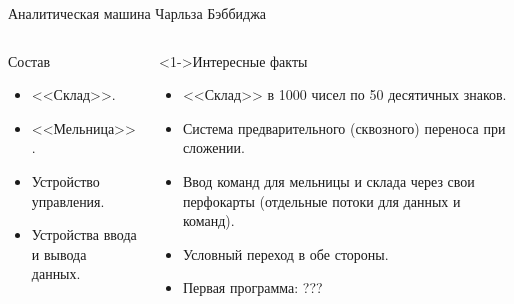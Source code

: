 \documentclass[pdf,9pt,aspectratio=169]{beamer}
\begin{document}
\begin{frame}{Аналитическая машина Чарльза Бэббиджа}
\begin{columns}[T]
\begin{column}[]{0.45\textwidth}
\begin{exampleblock}
\begin{center}
        \end{center}
      \end{exampleblock}
      \begin{block}{Состав}
        \begin{itemize}
          \item {<<Склад>>}.
          \item {<<Мельница>>}.
          \item Устройство управления.
          \item Устройства ввода и вывода данных.
        \end{itemize}
      \end{block}
    \end{column}
    \begin{column}[]{0.45\textwidth}  
      \begin{block}<1->{Интересные факты}
        \begin{itemize}
          \item {<<Склад>>} в 1000 чисел по 50 десятичных знаков.
          \item Система предварительного (сквозного) переноса при сложении.
          \item Ввод команд для мельницы и склада через  свои перфокарты (отдельные потоки для данных и команд).
          \item Условный переход в обе стороны.
          \item Первая программа: ???
        \end{itemize}
      \end{block}
    \end{column}
  \end{columns}
\end{frame}
\end{document}
